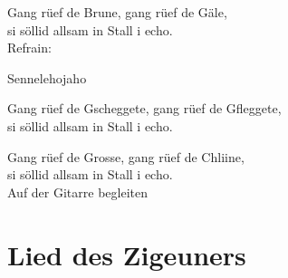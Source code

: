 \documentclass[
  letterpaper,
  a5paper]{memoir}
\begin{document}
Gang rüef de Brune, gang rüef de Gäle,\\
si söllid allsam in Stall i echo.\\
Refrain:

Sennelehojaho

Gang rüef de Gscheggete, gang rüef de Gfleggete,\\
si söllid allsam in Stall i echo.

Gang rüef de Grosse, gang rüef de Chliine,\\
si söllid allsam in Stall i echo.\\
Auf der Gitarre begleiten

\hypertarget{lied-des-zigeuners}{%
\chapter{Lied des Zigeuners}\label{lied-des-zigeuners}}
\end{document}
